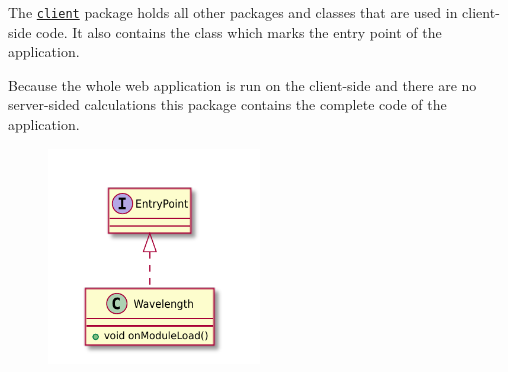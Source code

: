The \texttt{\hyperref[pkg:edu.kit.wavelength.client]{client}} package holds all other packages and classes that are used in client-side code. 
It also contains the \texttt{} class which marks the entry point of the application.

Because the whole web application is run on the client-side and there are no server-sided calculations 
this package contains the complete code of the application.

\begin{figure}[H]
	\centering
	\includegraphics[width=0.5\textwidth]{packageDiagrams/clientPackage}
\end{figure}
